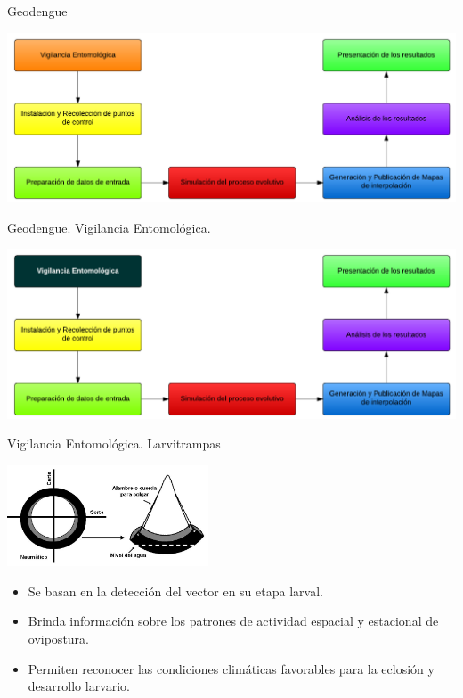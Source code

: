 
\begin{frame}[c]{Geodengue}
\begin{center}
    \includegraphics[width=\textwidth]{./graphics/propuesta.png}
\end{center}
\end{frame}


\begin{frame}[c]{Geodengue. Vigilancia Entomológica.}
\begin{center}
    \includegraphics[width=\textwidth]{./graphics/propuesta-vigilancia-entomologica.png}
\end{center}
\end{frame}

\begin{frame}[t]{Vigilancia Entomológica. Larvitrampas}
  \begin{center}
    \includegraphics[height=3cm]{../book/anexos/graphics/construccion-larvitrampa.png}
    \begin{itemize}
      \item Se basan en la detección del vector en su etapa larval.
      \item Brinda información sobre los patrones de actividad espacial y estacional de ovipostura.
      \item Permiten reconocer las condiciones climáticas favorables para la eclosión y desarrollo larvario.
    \end{itemize}
  \end{center}
\end{frame}

